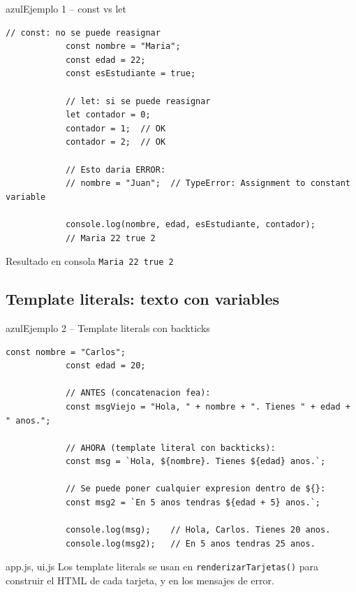 \documentclass[11pt,a4paper]{article}
\begin{document}
	\begin{cajacodigo}{azul}{Ejemplo 1 -- const vs let}
		\begin{lstlisting}[style=codejs]
			// const: no se puede reasignar
			const nombre = "Maria";
			const edad = 22;
			const esEstudiante = true;
			
			// let: si se puede reasignar
			let contador = 0;
			contador = 1;  // OK
			contador = 2;  // OK
			
			// Esto daria ERROR:
			// nombre = "Juan";  // TypeError: Assignment to constant variable
			
			console.log(nombre, edad, esEstudiante, contador);
			// Maria 22 true 2
		\end{lstlisting}
	\end{cajacodigo}
	
	\begin{cajaresultado}{Resultado en consola}
		\texttt{Maria 22 true 2}
	\end{cajaresultado}
	
	\subsection{Template literals: texto con variables}
	
	\begin{cajacodigo}{azul}{Ejemplo 2 -- Template literals con backticks}
		\begin{lstlisting}[style=codejs]
			const nombre = "Carlos";
			const edad = 20;
			
			// ANTES (concatenacion fea):
			const msgViejo = "Hola, " + nombre + ". Tienes " + edad + " anos.";
			
			// AHORA (template literal con backticks):
			const msg = `Hola, ${nombre}. Tienes ${edad} anos.`;
			
			// Se puede poner cualquier expresion dentro de ${}:
			const msg2 = `En 5 anos tendras ${edad + 5} anos.`;
			
			console.log(msg);    // Hola, Carlos. Tienes 20 anos.
			console.log(msg2);   // En 5 anos tendras 25 anos.
		\end{lstlisting}
	\end{cajacodigo}
	
	\begin{cajapractica}{app.js, ui.js}
		Los template literals se usan en \texttt{renderizarTarjetas()} para construir el HTML de cada tarjeta, y en los mensajes de error.
	\end{cajapractica}
	
\end{document}
